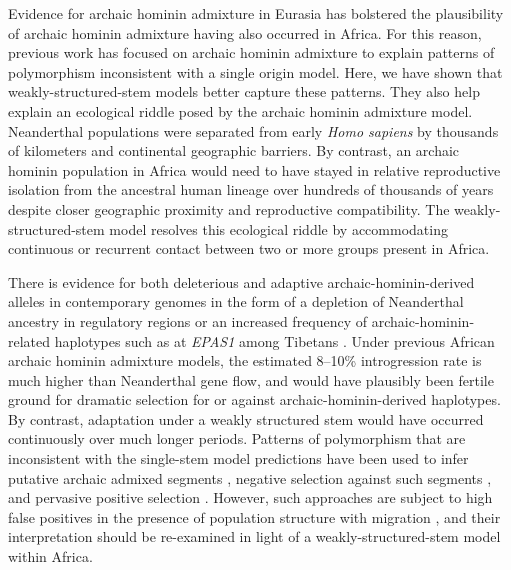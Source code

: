 \documentclass[]{article}
\begin{document}
Evidence for archaic hominin admixture in Eurasia has bolstered the plausibility of
archaic hominin admixture having also occurred in Africa. For this reason, previous
work has focused on archaic hominin admixture to explain patterns of polymorphism
inconsistent with a single origin model. Here, we have shown that
weakly-structured-stem models better capture these patterns.
They also help explain an
ecological riddle posed by the archaic hominin admixture model. Neanderthal populations
were separated from early \emph{Homo sapiens} by thousands of kilometers and
continental geographic barriers. By contrast, an archaic hominin population in
Africa would need to have stayed in relative reproductive isolation from the
ancestral human lineage over hundreds of thousands of years despite closer geographic
proximity and reproductive compatibility. The weakly-structured-stem model
resolves this ecological riddle by accommodating continuous or recurrent
contact between two or more groups present in Africa.

There is evidence for both deleterious and adaptive archaic-hominin-derived alleles in
contemporary genomes in the form of a depletion of Neanderthal ancestry in regulatory
regions \citep{Petr2019-xo} or an increased frequency of archaic-hominin-related
haplotypes such as at \emph{EPAS1} among Tibetans \citep{Zhang2021-xx}. Under previous
African archaic hominin admixture models, the estimated 8--10\% introgression rate is
much higher than Neanderthal gene flow, and would have plausibly been fertile
ground for dramatic selection for or against archaic-hominin-derived haplotypes\citep{Wall2019-ao}. By contrast, adaptation under a weakly
structured stem would have occurred continuously over much longer periods.
Patterns of polymorphism that are inconsistent with the single-stem model
predictions have been used to infer putative archaic admixed segments
\citep{Plagnol2006-lt,Hsieh2016-gk,Wall2019-ao,Durvasula2020-td}, negative
selection against such segments \citep{Wall2019-ao}, and pervasive positive
selection \citep{Schrider2017-kl}. However, such approaches are subject to high
false positives in the presence of population structure with migration
\citep{Petr2019-xo}, and their interpretation should be re-examined in light of
a weakly-structured-stem model within Africa. 
\end{document}
